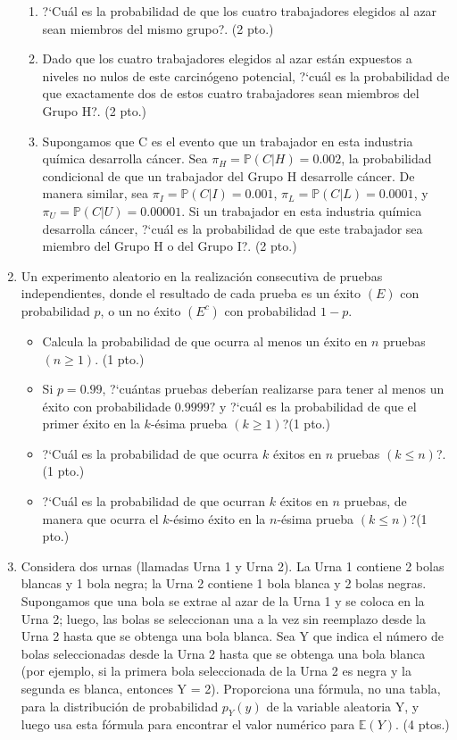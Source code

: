 \documentclass[a4paper,10pt]{report}
\begin{document}
\begin{enumerate}
\begin{enumerate}
	\item ?`Cu\'al es la probabilidad de que los cuatro trabajadores elegidos al azar sean miembros del mismo grupo?. \hfill{(2 pto.)} 
	\item Dado que los cuatro trabajadores elegidos al azar est\'an expuestos a niveles no nulos de este carcin\'ogeno potencial, ?`cu\'al es la probabilidad de que exactamente dos de estos cuatro trabajadores sean miembros del Grupo H?. \hfill{(2 pto.)} 
	\item Supongamos que C es el evento que un trabajador en esta industria qu\'imica desarrolla c\'ancer. Sea $\pi_{H} = \mathbb{P}(C|H) = 0.002$, la probabilidad condicional de que un trabajador del Grupo H desarrolle c\'ancer. De manera similar, sea $\pi_{I} = \mathbb{P}(C|I) = 0.001$, $\pi_{L}= \mathbb{P}(C|L) = 0.0001$, y $\pi_{U} = \mathbb{P}(C|U) = 0.00001$. Si un trabajador en esta industria qu\'imica desarrolla c\'ancer, ?`cu\'al es la probabilidad de que este trabajador sea miembro del Grupo H o del Grupo I?. \hfill{(2 pto.)} 
\end{enumerate}
\item Un experimento aleatorio en la realizaci\'on consecutiva de pruebas independientes, donde el resultado de cada prueba  es un \'exito $(E)$ con probabilidad $p$, o un no \'exito $(E^c)$ con probabilidad $1-p$.
\begin{itemize}
	\item Calcula la probabilidad de que ocurra al menos un \'exito en $n$ pruebas $(n\geq 1)$. \hfill{(1 pto.)} 
	\item Si $p=0.99$, ?`cu\'antas pruebas deber\'ian realizarse para tener al menos un \'exito con probabilidade $0.9999?$ y ?`cu\'al es la probabilidad de que el primer \'exito en la $k$-\'esima prueba $(k\geq 1)$?\hfill{(1 pto.)}
	\item ?`Cu\'al es la probabilidad de que ocurra $k$ \'exitos en $n$ pruebas $(k\leq n)$?.\hfill{(1 pto.)}
	\item ?`Cu\'al es la probabilidad de que ocurran $k$ \'exitos en $n$ pruebas, de manera que ocurra el $k$-\'esimo \'exito en la $n$-\'esima prueba $(k\leq n)$?\hfill{(1 pto.)}
\end{itemize}
\item  Considera dos urnas (llamadas Urna 1 y Urna 2). La Urna 1 contiene 2 bolas blancas y 1 bola negra; la Urna 2 contiene 1 bola blanca y 2 bolas negras.
Supongamos que una bola se extrae al azar de la Urna 1 y se coloca en la Urna 2; luego, las bolas se seleccionan una a la vez sin reemplazo desde la Urna 2 hasta que se obtenga una bola blanca. Sea  Y  que indica el n\'umero de bolas seleccionadas desde la Urna 2 hasta que se obtenga una bola blanca (por ejemplo, si la primera bola seleccionada de la Urna 2 es negra y la segunda es blanca, entonces Y = 2). Proporciona una f\'ormula, no una tabla, para la distribuci\'on de probabilidad $p_Y(y)$ de la variable aleatoria Y, y luego usa esta f\'ormula para encontrar el valor num\'erico para $\mathbb{E}(Y)$. \hfill{(4 ptos.)}

\end{enumerate}
\end{document}

